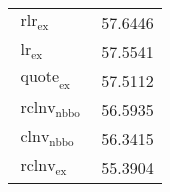 \begin{tabular}{p{6cm}S}
    $\operatorname{rlr}_{\text{ex}}$                                                                                                                                                                                                 & 57.6446    \\
    $\operatorname{lr}_{\text{ex}}$                                                                                                                                                                                                  & 57.5541    \\
    $\operatorname{quote}_{\text{ex}}$                                                                                                                                                                                               & 57.5112    \\
    $\operatorname{rclnv}_{\text{nbbo}}$                                                                                                                                                                                             & 56.5935    \\
    $\operatorname{clnv}_{\text{nbbo}}$                                                                                                                                                                                              & 56.3415    \\
    $\operatorname{rclnv}_{\text{ex}}$                                                                                                                                                                                               & 55.3904    \\

\end{tabular}

